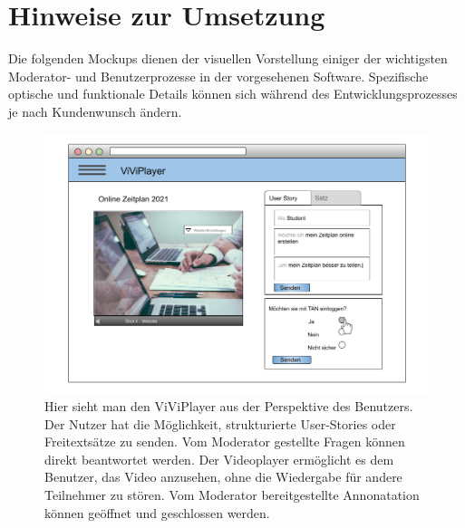 \section{Hinweise zur Umsetzung}
Die folgenden Mockups dienen der visuellen Vorstellung einiger der wichtigsten Moderator- und Benutzerprozesse in der vorgesehenen Software. Spezifische optische und funktionale Details können sich während des Entwicklungsprozesses je nach Kundenwunsch ändern.
\linebreak
\linebreak

\begin{figure}[h]
  \includegraphics[width=\linewidth]{sections/pictures/5dot1.png}
  \caption{Hier sieht man den ViViPlayer aus der Perspektive des Benutzers. Der Nutzer hat die Möglichkeit, strukturierte User-Stories oder Freitextsätze zu senden. Vom Moderator gestellte Fragen können direkt beantwortet werden. Der Videoplayer ermöglicht es dem Benutzer, das Video anzusehen, ohne die Wiedergabe für andere Teilnehmer zu stören. Vom Moderator bereitgestellte Annonatation können geöffnet und geschlossen werden.}
  \label{fig:5dot1}
\end{figure}

